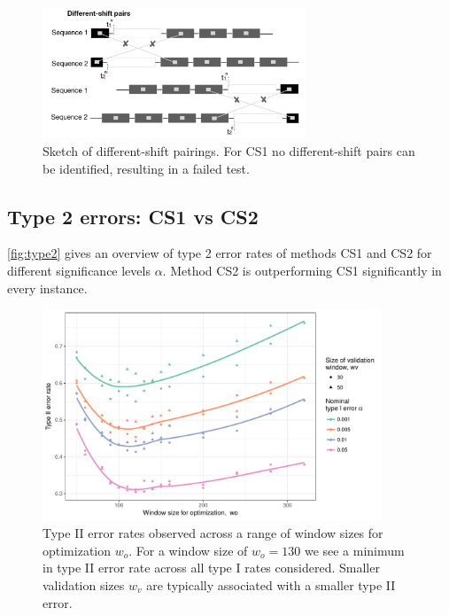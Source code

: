 \documentclass[12pt]{article}
\begin{document}
\begin{appendix}
\begin{figure}[hbtp]
\centering
\includegraphics[width=0.7\textwidth]{images/diff-shift-failure.png}

\caption{\label{diff-shift-failure}Sketch of different-shift pairings. For CS1 no different-shift pairs can be identified, resulting in a failed test.}
\end{figure}

\newpage
\subsection{Type 2 errors: CS1 vs CS2}
\label{appendix:appxtype2}
\autoref{fig:type2} gives an overview of type 2 error rates of methods CS1 and CS2 for different significance levels $\alpha$. Method CS2 is outperforming CS1 significantly in every instance.

\begin{figure}[h]

{\centering \includegraphics[width=0.9\textwidth]{figures/type2-1} 

}

\caption{Type II error rates observed across a range of window sizes for optimization $w_o$. For a window size of $w_o = 130$ we see a minimum in type II error rate across all type I rates considered. Smaller validation sizes $w_v$ are typically associated with a smaller type II error.}\label{fig:type2}
\end{figure}

\end{appendix}



\end{document}
